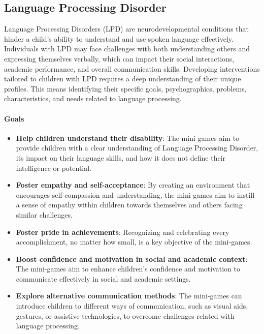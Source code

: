 \subsection{Language Processing Disorder}
Language Processing Disorders (LPD) are neurodevelopmental conditions that hinder a child’s ability to understand and use spoken language effectively. Individuals with LPD may face challenges with both understanding others and expressing themselves verbally, which can impact their social interactions, academic performance, and overall communication skills. Developing interventions tailored to children with LPD requires a deep understanding of their unique profiles. This means identifying their specific goals, psychographics, problems, characteristics, and needs related to language processing.

\paragraph{Goals}
\begin{itemize}
    \item \textbf{Help children understand their disability}: The mini-games aim to provide children with a clear understanding of Language Processing Disorder, its impact on their language skills, and how it does not define their intelligence or potential.
    \item \textbf{Foster empathy and self-acceptance}: By creating an environment that encourages self-compassion and understanding, the mini-games aim to instill a sense of empathy within children towards themselves and others facing similar challenges.
    \item \textbf{Foster pride in achievements}: Recognizing and celebrating every accomplishment, no matter how small, is a key objective of the mini-games.
    \item \textbf{Boost confidence and motivation in social and academic context}: The mini-games aim to enhance children's confidence and motivation to communicate effectively in social and academic settings.
    \item \textbf{Explore alternative communication methods}: The mini-games can introduce children to different ways of communication, such as visual aids, gestures, or assistive technologies, to overcome challenges related with language processing.
\end{itemize}

